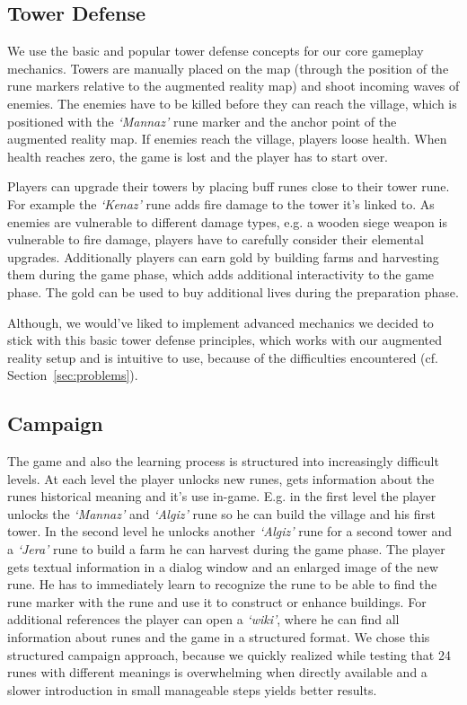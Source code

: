 
\subsection{Tower Defense}
\label{sec:game_design:subsec:tower_defense}

We use the basic and popular tower defense concepts for our core gameplay mechanics. Towers are manually placed on the map (through the position of the rune markers relative to the augmented reality map) and shoot incoming waves of enemies. The enemies have to be killed before they can reach the village, which is positioned with the \textit{`Mannaz'} rune marker and the anchor point of the augmented reality map.
If enemies reach the village, players loose health. When health reaches zero, the game is lost and the player has to start over.

Players can upgrade their towers by placing buff runes close to their tower rune. For example the \textit{`Kenaz'} rune adds fire damage to the tower it's linked to.
As enemies are vulnerable to different damage types, e.g. a wooden siege weapon is vulnerable to fire damage, players have to carefully consider their elemental upgrades.
Additionally players can earn gold by building farms and harvesting them during the game phase, which adds additional interactivity to the game phase.
The gold can be used to buy additional lives during the preparation phase.

Although, we would've liked to implement advanced mechanics we decided to stick with this basic tower defense principles, which works with our augmented reality setup and is intuitive to use, because of the difficulties encountered (cf. Section~\ref{sec:problems}).


\subsection{Campaign}
\label{sec:game_design:subsec:campaign}

The game and also the learning process is structured into increasingly difficult levels. At each level the player unlocks new runes, gets information about the runes historical meaning and it's use in-game.
E.g. in the first level the player unlocks the \textit{`Mannaz'} and \textit{`Algiz'} rune so he can build the village and his first tower. In the second level he unlocks another \textit{`Algiz'} rune for a second tower and a \textit{`Jera'} rune to build a farm he can harvest during the game phase.
The player gets textual information in a dialog window and an enlarged image of the new rune.
He has to immediately learn to recognize the rune to be able to find the rune marker with the rune and use it to construct or enhance buildings.
For additional references the player can open a \textit{`wiki'}, where he can find all information about runes and the game in a structured format.
We chose this structured campaign approach, because we quickly realized while testing that 24 runes with different meanings is overwhelming when directly available and a slower introduction in small manageable steps yields better results.

